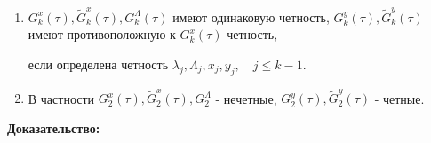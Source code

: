 \begin{utv}
\begin{enumerate}

\item $G_k^x(\tau),\tilde G_k^x(\tau),G_k^\Lambda(\tau)$ имеют одинаковую четность, $G_k^y(\tau), \tilde G_k^y(\tau)$ имеют противоположную к $G_k^x(\tau)$ четность, 

если определена четность $\lambda_j,\Lambda_j,x_j,y_j, \quad j \le k-1$.

\item В частности $G_2^x(\tau), \tilde G_2^x(\tau), G_2^\Lambda$ - нечетные, $G_2^y(\tau), \tilde G_2^y(\tau)$ - четные.
\end{enumerate}
\end{utv}
\textbf{Доказательство:}\nopagebreak[4]

